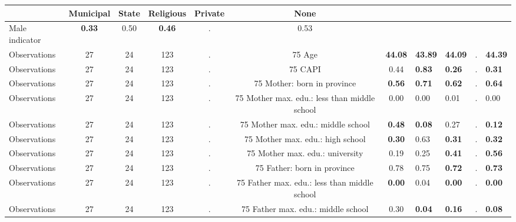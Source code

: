 \begin{tabular}{l c c c c c c }
\toprule
& \textbf{Municipal} & \textbf{State} & \textbf{Religious} & \textbf{Private} & \textbf{None} \\
\midrule
Male indicator & \textbf{     0.33} &      0.50 & \textbf{     0.46} &         . &      0.53 \\
\midrule
Observations &        27 &        24 &       123 & . &        75
Age & \textbf{    44.08} & \textbf{    43.89} & \textbf{    44.09} &         . & \textbf{    44.39} \\
\midrule
Observations &        27 &        24 &       123 & . &        75
CAPI &      0.44 & \textbf{     0.83} & \textbf{     0.26} &         . & \textbf{     0.31} \\
\midrule
Observations &        27 &        24 &       123 & . &        75
Mother: born in province & \textbf{     0.56} & \textbf{     0.71} & \textbf{     0.62} &         . & \textbf{     0.64} \\
\midrule
Observations &        27 &        24 &       123 & . &        75
Mother max. edu.: less than middle school &      0.00 &      0.00 &      0.01 &         . &      0.00 \\
\midrule
Observations &        27 &        24 &       123 & . &        75
Mother max. edu.: middle school & \textbf{     0.48} & \textbf{     0.08} &      0.27 &         . & \textbf{     0.12} \\
\midrule
Observations &        27 &        24 &       123 & . &        75
Mother max. edu.: high school & \textbf{     0.30} &      0.63 & \textbf{     0.31} &         . & \textbf{     0.32} \\
\midrule
Observations &        27 &        24 &       123 & . &        75
Mother max. edu.: university &      0.19 &      0.25 & \textbf{     0.41} &         . & \textbf{     0.56} \\
\midrule
Observations &        27 &        24 &       123 & . &        75
Father: born in province &      0.78 &      0.75 & \textbf{     0.72} &         . & \textbf{     0.73} \\
\midrule
Observations &        27 &        24 &       123 & . &        75
Father max. edu.: less than middle school & \textbf{     0.00} &      0.04 & \textbf{     0.00} &         . & \textbf{     0.00} \\
\midrule
Observations &        27 &        24 &       123 & . &        75
Father max. edu.: middle school &      0.30 & \textbf{     0.04} & \textbf{     0.16} &         . & \textbf{     0.08} \\

\end{tabular}
